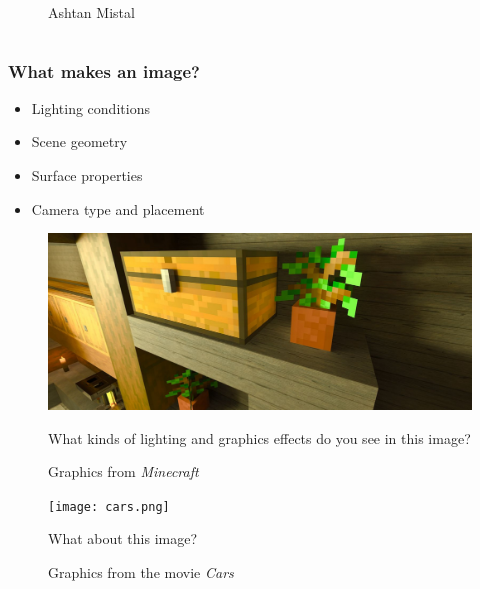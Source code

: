 \documentclass[12pt]{beamer}
\begin{document}
\begin{frame}
\begin{columns}
\begin{column}{0.4\textwidth}
\begin{figure}
          \caption{Ashtan Mistal}\label{fig:me}
        \end{figure}
      \end{column}
    \end{columns}
  \end{frame}




  \begin{frame}
    \frametitle{What makes an image?}
    \begin{itemize}
      \item Lighting conditions
      \item Scene geometry
      \item Surface properties
      \item Camera type and placement
    \end{itemize}

  \end{frame}

  \begin{frame}

    \begin{figure}
      \centering
      \includegraphics[width=\textwidth]{minecraft.jpg}
      \caption{Graphics from \textit{Minecraft}}\label{fig:minecraft}

      What kinds of lighting and graphics effects do you see in this image?
    \end{figure}
  \end{frame}

  \begin{frame}
    \begin{figure}
      \centering
      \texttt{[image: cars.png]}
      \caption{Graphics from the movie \textit{Cars}}\label{fig:cars}

      What about this image?
    \end{figure}
  \end{frame}
\end{document}
